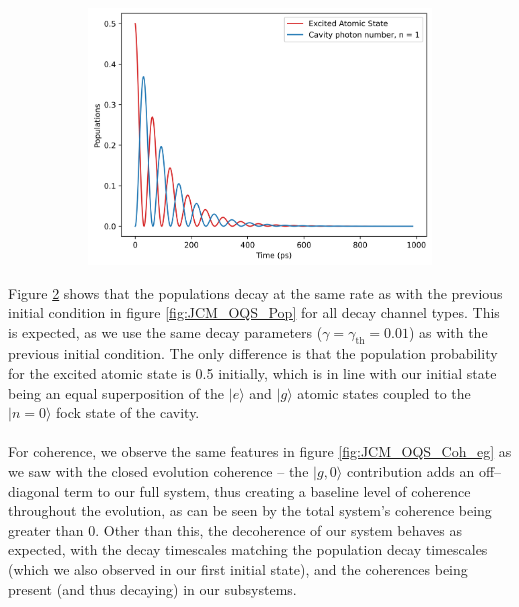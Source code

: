\documentclass[12pt]{article}
\begin{document}
\begin{figure}[H]
    \vspace{0.5cm}
    
    \begin{subfigure}{0.45\textwidth}
        \centering
        \includegraphics[width=\linewidth]{Research Project/Code/results/JCM/OQS_Pop_Both_eg.png}
        \caption{}
        \label{fig:JCM_OQS_Pop_Both_eg}
    \end{subfigure}
    \hfill

    \caption{}
    \label{fig:JCM_OQS_Pop_eg}
\end{figure}

Figure \ref{fig:JCM_OQS_Pop_eg} shows that the populations decay at the same rate as with the previous initial condition in figure \ref{fig:JCM_OQS_Pop} for all decay channel types. This is expected, as we use the same decay parameters ($\gamma= \gamma_{\scriptscriptstyle \text{th}} = 0.01$) as with the previous initial condition. The only difference is that the population probability for the excited atomic state is 0.5 initially, which is in line with our initial state being an equal superposition of the $|e\rangle$ and $|g\rangle$ atomic states coupled to the $|n=0\rangle$ fock state of the cavity. \\
\\
For coherence, we observe the same features in figure \ref{fig:JCM_OQS_Coh_eg} as we saw with the closed evolution coherence  -- the $|g,0\rangle$ contribution adds an off--diagonal term to our full system, thus creating a baseline level of coherence throughout the evolution, as can be seen by the total system's coherence being greater than 0. Other than this, the decoherence of our system behaves as expected, with the decay timescales matching the population decay timescales (which we also observed in our first initial state), and the coherences being present (and thus decaying) in our subsystems. 
\end{document}
